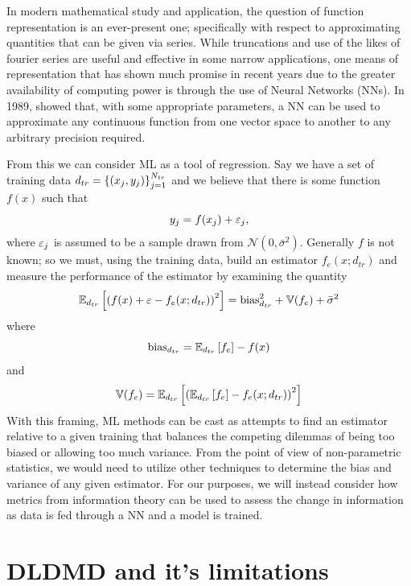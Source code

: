 In modern mathematical study and application, the question of function representation is
an ever-present one; specifically with respect to approximating quantities that can be 
given via series. While truncations and use of the likes of fourier series are useful and 
effective in some narrow applications, one means of representation that has shown much 
promise in recent years due to the greater availability of computing power is through 
the use of Neural Networks (NNs). In 1989, \cite{hornik} showed that, with some appropriate
parameters, a NN can be used to approximate any continuous function from one vector space 
to another to any arbitrary precision required. 

From this we can consider ML as a tool of regression. Say we have a set of training data
$d_{tr} = \left\{(x_j, y_j)\right\}_{j=1}^{N_{tr}}$ and we believe that there is some function
$f(x)$ such that 
$$y_j = f(x_j) + \varepsilon_j,$$
where $\varepsilon_j$ is assumed to be a sample drawn from $\mathcal{N}(0, \bar{\sigma}^2)$. 
Generally $f$ is not known; so we must, using the training data, build an estimator 
$f_e(x; d_{tr})$ and measure the performance of the estimator by examining the quantity
$$\mathbb{E}_{d_{tr}}\left[\left(f(x) + \varepsilon - f_e(x;d_{tr})\right)^2\right] = 
\text{bias}_{d_{tr}}^2 + \mathbb{V}(f_e) + \bar{\sigma}^2$$
where 
$$\text{bias}_{d_{tr}} = \mathbb{E}_{d_{tr}}\left[f_e\right] - f(x)$$
and 
$$\mathbb{V}(f_e) = \mathbb{E}_{d_{tr}}\left[\left(\mathbb{E}_{d_{tr}}\left[f_e\right] - f_e(x; d_{tr})\right)^2\right]$$ 
With this framing, ML methods can be cast as attempts to find an estimator relative to
a given training that balances the competing dilemmas of being too biased or allowing too
much variance. From the point of view of non-parametric statistics, we would need to utilize 
other techniques\cite{hollander} to determine the bias and variance of any given estimator. For our purposes, 
we will instead consider how metrics from information theory can be used to assess the change in 
information as data is fed through a NN and a model is trained.

\section{DLDMD and it's limitations}

